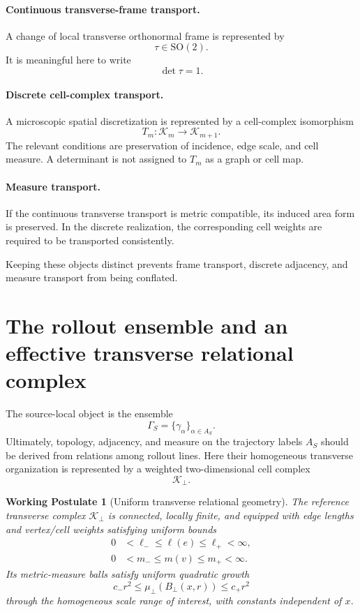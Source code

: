 \documentclass[11pt]{article}
\newtheorem{assumption}{Working Postulate}
\newcommand{\SO}{\mathrm{SO}}
\newcommand{\cK}{\mathcal{K}}
\begin{document}
\paragraph{Continuous transverse-frame transport.}
A change of local transverse orthonormal frame is represented by
\[
\tau\in\SO(2).
\]
It is meaningful here to write
\[
\det \tau=1.
\]

\paragraph{Discrete cell-complex transport.}
A microscopic spatial discretization is represented by a cell-complex isomorphism
\[
T_m:\cK_m\rightarrow\cK_{m+1}.
\]
The relevant conditions are preservation of incidence, edge scale, and cell measure. A determinant is not assigned to \(T_m\) as a graph or cell map.

\paragraph{Measure transport.}
If the continuous transverse transport is metric compatible, its induced area form is preserved. In the discrete realization, the corresponding cell weights are required to be transported consistently.

Keeping these objects distinct prevents frame transport, discrete adjacency, and measure transport from being conflated.

\section{The rollout ensemble and an effective transverse relational complex}

The source-local object is the ensemble
\[
\Gamma_S=\{\gamma_\alpha\}_{\alpha\in A_S}.
\]
Ultimately, topology, adjacency, and measure on the trajectory labels \(A_S\) should be derived from relations among rollout lines. Here their homogeneous transverse organization is represented by a weighted two-dimensional cell complex
\[
\cK_\perp .
\]

\begin{assumption}[Uniform transverse relational geometry]
The reference transverse complex \(\cK_\perp\) is connected, locally finite, and equipped with edge lengths and vertex/cell weights satisfying uniform bounds
\begin{equation}
\begin{aligned}
0&<\ell_-\le \ell(e)\le \ell_+<\infty,\\
0&<m_-\le m(v)\le m_+<\infty.
\end{aligned}
\label{eq:uniformweights}
\end{equation}
Its metric-measure balls satisfy uniform quadratic growth
\begin{equation}
c_- r^2
\le
\mu_\perp(B_\perp(x,r))
\le
c_+ r^2
\label{eq:quadratic}
\end{equation}
through the homogeneous scale range of interest, with constants independent of \(x\).
\end{assumption}
\end{document}

